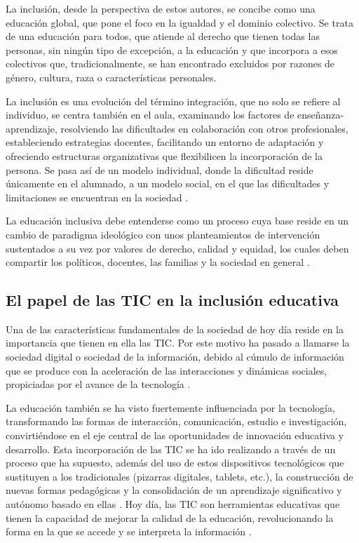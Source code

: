 \documentclass{textolivre}
\begin{document}
La inclusión, desde la perspectiva de estos autores, se concibe como una educación global, que pone el foco en la igualdad y el dominio colectivo. Se trata de  una educación para todos, que atiende al derecho que tienen todas las personas, sin ningún tipo de excepción, a la educación y que incorpora a esos colectivos que, tradicionalmente, se han encontrado excluidos por razones de género, cultura, raza o características personales.

La inclusión es una evolución del término integración, que no solo se refiere al individuo, se centra también en el aula, examinando los factores de enseñanza-aprendizaje, resolviendo las dificultades en colaboración con otros profesionales, estableciendo estrategias docentes, facilitando un entorno de adaptación y ofreciendo estructuras organizativas que flexibilicen la incorporación de la persona. Se pasa así de un modelo individual, donde la dificultad reside únicamente en el alumnado, a un modelo social, en el que las dificultades y limitaciones se encuentran en la sociedad \cite{gallegoortega2016}.

La educación inclusiva debe entenderse como un proceso cuya base reside en un cambio de paradigma ideológico con unos planteamientos de intervención sustentados a su vez por valores de derecho, calidad y equidad, los cuales deben compartir los políticos, docentes, las familias y la sociedad en general \cite{muntaner2019}.

\subsection{El papel de las TIC en la inclusión educativa}
Una de las características fundamentales de la sociedad de hoy día reside en la importancia que tienen en ella las TIC. Por este motivo ha pasado a llamarse la sociedad digital o sociedad de la información, debido al cúmulo de información que se produce con la aceleración de las interacciones y dinámicas sociales, propiciadas por el avance de  la tecnología \cite{hernandez2017, cabero-almenara2019}.

La educación también se ha visto fuertemente influenciada por la tecnología, transformando las formas de interacción, comunicación, estudio e investigación, convirtiéndose en el eje central de las oportunidades de innovación educativa y desarrollo. Esta incorporación de las TIC se ha ido realizando a través de un proceso que ha supuesto, además del uso de estos dispositivos tecnológicos que sustituyen a los tradicionales (pizarras digitales, tablets, etc.), la construcción de nuevas formas pedagógicas y la consolidación de un aprendizaje significativo y autónomo basado en ellas \cite{caceresreche2020}. Hoy día, las TIC son herramientas educativas que tienen la capacidad de mejorar la calidad de la educación, revolucionando la forma en la que se accede y se interpreta la información \cite{morenoguerrero2020}.
\end{document}

